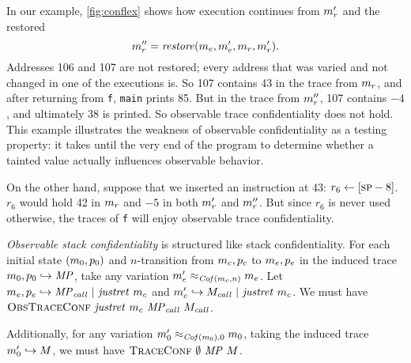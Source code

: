 \documentclass[acmsmall,review,anonymous]{acmart}\settopmatter{printfolios=true,printccs=false,printacmref=false}
\begin{document}
{%

      In our example, \cref{fig:conflex} shows how execution continues from
      \(m_r'\) and the restored
      \[\mach_r'' = \mathit{restore}(%
      \mach_e,\mach_e',\mach_r,\mach_r').
      \]
      Addresses 106 and 107
      are not restored; every address that was varied and not changed in one
      of the executions is. So 107 contains 43 in the trace from \(m_r\),
      and after returning from {\tt f}, {\tt main} prints 85. But in the trace
      from \(m_r''\), 107 contains $-4$, and ultimately 38 is printed.
      So observable trace confidentiality does not hold. This example
      illustrates the weakness of observable confidentiality as a testing
      property: it takes until the very end of the program to determine whether
      a tainted value actually influences observable behavior.

      On the other hand, suppose that we inserted an instruction at 43:
      \(r_6 \leftarrow [\textsc{sp}-8]\). \(r_6\) would hold 42 in \(m_r\)
      and $-5$ in both \(m_r'\) and \(m_r''\). But since \(r_6\) is
      never used otherwise, the traces of {\tt f} will enjoy observable trace
      confidentiality.


      {\em Observable stack confidentiality} is structured like stack
      confidentiality. For each initial
      state \((m_0, p_0)\) and \(n\)-transition from \(m_c,p_c\)
      to \(m_e,p_e\) in the induced trace
      \(m_0,p_0 \hookrightarrow \mathit{MP}\), take any
      variation \(m_e' \approx_{\mathit{Cof}(m_c,n)} m_e\). Let
      \(m_e,p_e \hookrightarrow \mathit{MP}_{\mathit{call}} ~ | ~
      \mathit{justret}\ m_c\) and \(m_e' \hookrightarrow M_{\mathit{call}} ~ | ~
      \mathit{justret}\ m_c\). We must have \(\text{\sc ObsTraceConf} ~
      \mathit{justret}\ m_c ~ \mathit{MP}_{\mathit{call}} ~ M_{\mathit{call}}\).

      Additionally, for any variation \(m_0' \approx_{\mathit{Cof}(m_0),0}
      m_0\), taking the induced trace  \(m_0' \hookrightarrow
      M\), we must have \(\text{\sc TraceConf} ~ \emptyset ~ \mathit{MP} ~ M\).

}
\end{document}
